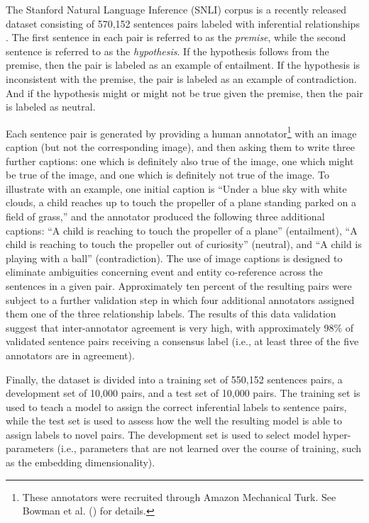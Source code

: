 The Stanford Natural Language Inference (SNLI) corpus is a recently released dataset consisting of 570,152 sentences pairs labeled with inferential relationships \citep{Bowman:2015}. The first sentence in each pair is referred to as the \textit{premise}, while the second sentence is referred to as the \textit{hypothesis}. If the hypothesis follows from the premise, then the pair is labeled as an example of entailment. If the hypothesis is inconsistent with the premise, the pair is labeled as an example of contradiction. And if the hypothesis might or might not be true given the premise, then the pair is labeled as neutral.

Each sentence pair is generated by providing a human annotator\footnote{These annotators were recruited through Amazon Mechanical Turk. See Bowman et al. (\citeyear{Bowman:2015}) for details.} with an image caption (but not the corresponding image), and then asking them to write three further captions: one which is definitely also true of the image, one which might be true of the image, and one which is definitely not true of the image. To illustrate with an example, one initial caption is ``Under a blue sky with white clouds, a child reaches up to touch the propeller of a plane standing parked on a field of grass,'' and the annotator produced the following three additional captions: ``A child is reaching to touch the propeller of a plane'' (entailment), ``A child is reaching to touch the propeller out of curiosity'' (neutral), and ``A child is playing with a ball'' (contradiction). The use of image captions is designed to eliminate ambiguities concerning event and entity co-reference across the sentences in a given pair. Approximately ten percent of the resulting pairs were subject to a further validation step in which four additional annotators assigned them one of the three relationship labels. The results of this data validation suggest that inter-annotator agreement is very high, with approximately 98\% of validated sentence pairs receiving a consensus label (i.e., at least three of the five annotators are in agreement). 

Finally, the dataset is divided into a training set of 550,152 sentences pairs, a development set of 10,000 pairs, and a test set of 10,000 pairs. The training set is used to teach a model to assign the correct inferential labels to sentence pairs, while the test set is used to assess how the well the resulting model is able to assign labels to novel pairs. The development set is used to select model hyper-parameters (i.e., parameters that are not learned over the course of training, such as the embedding dimensionality). 

